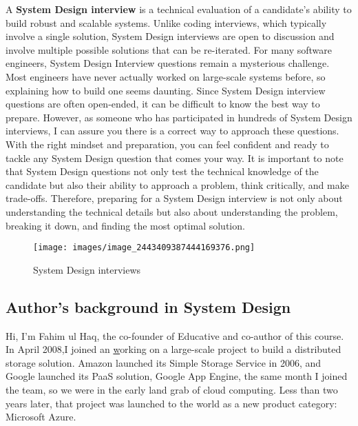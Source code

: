 

A \textbf{System Design interview} is a technical evaluation of a candidate's ability to build robust and scalable systems. 
Unlike coding interviews, which typically involve a single solution, System Design interviews are open to discussion and involve multiple possible solutions that can be re-iterated. 
For many software engineers, System Design Interview questions remain a mysterious challenge. 
Most engineers have never actually worked on large-scale systems before, so explaining how to build one seems daunting. 
Since System Design interview questions are often open-ended, it can be difficult to know the best way to prepare. 
However, as someone who has participated in hundreds of System Design interviews, I can assure you there is a correct way to approach these questions. 
With the right mindset and preparation, you can feel confident and ready to tackle any System Design question that comes your way. 
It is important to note that System Design questions not only test the technical knowledge of the candidate but also their ability to approach a problem, think critically, and make trade-offs. 
Therefore, preparing for a System Design interview is not only about understanding the technical details but also about understanding the problem, breaking it down, and finding the most optimal solution.

\begin{figure}[htbp]
    \centering
    \texttt{[image: images/image\_2443409387444169376.png]}
    \caption{System Design interviews}
\end{figure}

\subsection{Author's background in System Design}\label{gIyZLoEnzqAWz9PwuDQ-5}

Hi, I'm Fahim ul Haq, the co-founder of Educative and co-author of this course. 
In April 2008,I joined an \href{https://www.educative.io/blog/25-years-of-developer-interviews{internal team at Microsoft}}working on a large-scale project to build a distributed storage solution. 
Amazon launched its Simple Storage Service in 2006, and Google launched its PaaS solution, Google App Engine, the same month I joined the team, so we were in the early land grab of cloud computing. 
Less than two years later, that project was launched to the world as a new product category: Microsoft Azure.

